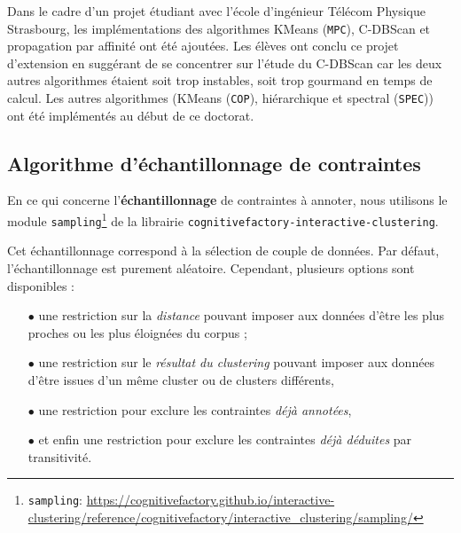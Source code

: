 		\begin{leftBarInformation}
			Dans le cadre d'un projet étudiant avec l'école d'ingénieur Télécom Physique Strasbourg, les implémentations des algorithmes  KMeans (\texttt{MPC}), C-DBScan et propagation par affinité ont été ajoutées. Les élèves ont conclu ce projet d'extension en suggérant de se concentrer sur l'étude du C-DBScan car les deux autres algorithmes étaient soit trop instables, soit trop gourmand en temps de calcul.
			Les autres algorithmes (KMeans (\texttt{COP}), hiérarchique et spectral (\texttt{SPEC})) ont été implémentés au début de ce doctorat.
		\end{leftBarInformation}
		
		
		\subsection{Algorithme d'échantillonnage de contraintes}
		\label{section:3.3.4-ALGORITHMES-ECHANTILLONNAGE-DE-CONTRAINTES}
		
		En ce qui concerne l'\textbf{échantillonnage} de contraintes à annoter, nous utilisons le module \texttt{sampling}\footnote{
			\texttt{sampling}: \url{https://cognitivefactory.github.io/interactive-clustering/reference/cognitivefactory/interactive_clustering/sampling/}
		} de la librairie \texttt{cognitivefactory-interactive-clustering}.
		
		Cet échantillonnage correspond à la sélection de couple de données.
		Par défaut, l'échantillonnage est purement aléatoire.
		Cependant, plusieurs options sont disponibles :
		
		\begin{itemize}
			\item[\(\bullet\)] une restriction sur la \textit{distance} pouvant imposer aux données d'être les plus proches ou les plus éloignées du corpus ;
			\item[\(\bullet\)] une restriction sur le \textit{résultat du clustering} pouvant imposer aux données d'être issues d'un même cluster ou de clusters différents,
			\item[\(\bullet\)] une restriction pour exclure les contraintes \textit{déjà annotées},
			\item[\(\bullet\)] et enfin une restriction pour exclure les contraintes \textit{déjà déduites} par transitivité.
		\end{itemize}
		
